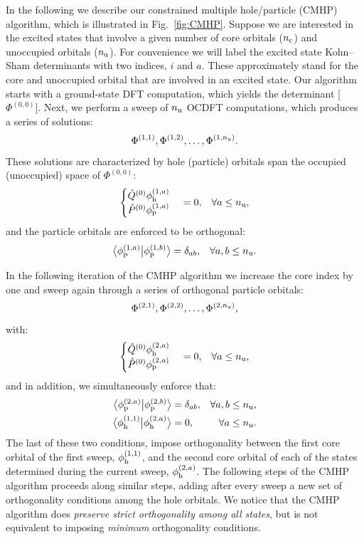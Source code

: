 \documentclass[12pt]{article}
\newcommand{\braket}[3][0]
{\ifthenelse{\equal{#1}{0}}{\left\langle #2 \middle| #3 \right\rangle}
{\ifthenelse{\equal{#1}{1}}{\big\langle #2 \big| #3 \big\rangle}
{\ifthenelse{\equal{#1}{2}}{\Big\langle #2 \Big| #3 \Big\rangle}
{\ifthenelse{\equal{#1}{3}}{\bigg\langle #2 \bigg| #3 \bigg\rangle}
{\ifthenelse{\equal{#1}{4}}{\Bigg\langle #2 \Bigg| #3 \Bigg\rangle}
{Error}}}}}
}
\begin{document}
In the following we describe our constrained multiple hole/particle (CMHP) algorithm, which is illustrated in Fig.~\ref{fig:CMHP}.
Suppose we are interested in the excited states that involve a given number of core orbitals ($n_{\rm c}$) and unoccupied orbitals ($n_{\rm u}$).
For convenience we will label the excited state Kohn--Sham determinants with two indices, $i$ and $a$.  These approximately stand for the core and unoccupied orbital that are involved in an excited state.
Our algorithm starts with a ground-state DFT computation, which yields the determinant [$\Phi^{(0,0)}$].
Next, we perform a sweep of $n_{\rm u}$ OCDFT computations, which produces a series of solutions:
\begin{equation}
\Phi^{(1,1)}, \Phi^{(1,2)}, \ldots, \Phi^{(1,n_{\rm u})}.
\end{equation}
These solutions are characterized by hole (particle) orbitals span the occupied (unoccupied) space of $\Phi^{(0,0)}$:
\begin{align}
\begin{cases}
\hat{Q}^{(0)}\phi_{\rm h}^{(1,a)}\\
\hat{P}^{(0)}\phi_{\rm p}^{(1,a)}
\end{cases} &= 0,&\forall a \leq n_{\rm u},
\end{align}
and the particle orbitals are enforced to be orthogonal:
\begin{align}
\braket[1]{\phi^{(1,a)}_{\rm p}}{\phi^{(1,b)}_{\rm p}} &= \delta_{ab},&\forall a,b \leq n_{\rm u}.
\end{align}


In the following iteration of the CMHP algorithm we increase the core index by one and sweep again through a series of orthogonal particle orbitals:
\begin{equation}
\Phi^{(2,1)}, \Phi^{(2,2)}, \ldots, \Phi^{(2,n_{\rm u})},
\end{equation}
with:
\begin{align}
\begin{cases}
\hat{Q}^{(0)}\phi_{\rm h}^{(2,a)}\\
\hat{P}^{(0)}\phi_{\rm p}^{(2,a)}
\end{cases} &= 0,&\forall a \leq n_{\rm u},
\end{align}
and in addition, we simultaneously enforce that:
\begin{align}
\braket[1]{\phi^{(2,a)}_{\rm p}}{\phi^{(2,b)}_{\rm p}} &= \delta_{ab},&\forall a,b \leq n_{\rm u},\\
\braket[1]{\phi^{(1,1)}_{\rm h}}{\phi^{(2,a)}_{\rm h}} &=0,&\forall a \leq n_{\rm u}.
\end{align}
The last of these two conditions, impose orthogonality between the first core orbital of the first sweep, $\phi^{(1,1)}_{\rm h}$, and the second core orbital of each of the states determined during the current sweep, $\phi^{(2,a)}_{\rm h}$.
The following steps of the CMHP algorithm proceeds along similar steps, adding after every sweep a new set of orthogonality conditions among the hole orbitals.
We notice that the CMHP algorithm does \textit{preserve strict orthogonality among all states}, but is not equivalent to imposing \textit{minimum} orthogonality conditions.
\end{document}
